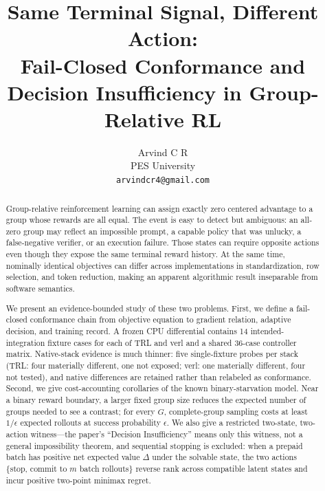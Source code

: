 \documentclass{article}
\title{Same Terminal Signal, Different Action:\\
Fail-Closed Conformance and Decision Insufficiency in Group-Relative RL}
\author{Arvind C R\\
PES University\\
\texttt{arvindcr4@gmail.com}}
\begin{document}
\maketitle

\begin{abstract}
Group-relative reinforcement learning can assign exactly zero centered
advantage to a group whose rewards are all equal.  The event is easy to detect
but ambiguous: an all-zero group may reflect an impossible prompt, a capable
policy that was unlucky, a false-negative verifier, or an execution failure.
Those states can require opposite actions even though they expose the same
terminal reward history.  At the same time, nominally identical objectives can
differ across implementations in standardization, row selection, and token
reduction, making an apparent algorithmic result inseparable from software
semantics.

We present an evidence-bounded study of these two problems.  First, we define a
fail-closed conformance chain from objective equation to gradient relation,
adaptive decision, and training record.  A frozen CPU differential contains 14
intended-integration fixture cases for each of TRL and verl and a shared
36-case controller matrix.  Native-stack evidence is much thinner: five
single-fixture probes per stack (TRL: four materially different, one not
exposed; verl: one materially different, four not tested), and native
differences are retained rather than relabeled as conformance.
Second, we give cost-accounting corollaries of the known binary-starvation
model.  Near a binary reward boundary, a larger fixed group size reduces the
expected number of groups needed to see a contrast; for every $G$,
complete-group sampling costs at least $1/\epsilon$ expected rollouts at
success probability $\epsilon$.  We also give a restricted two-state, two-action witness---the paper's
``Decision Insufficiency'' means only this witness, not a general
impossibility theorem, and sequential stopping is excluded: when a prepaid
batch has positive net expected value $\Delta$ under the solvable state, the
two actions \{stop, commit to $m$ batch rollouts\} reverse rank across
compatible latent states and incur positive two-point minimax regret.


\end{abstract}
\end{document}
